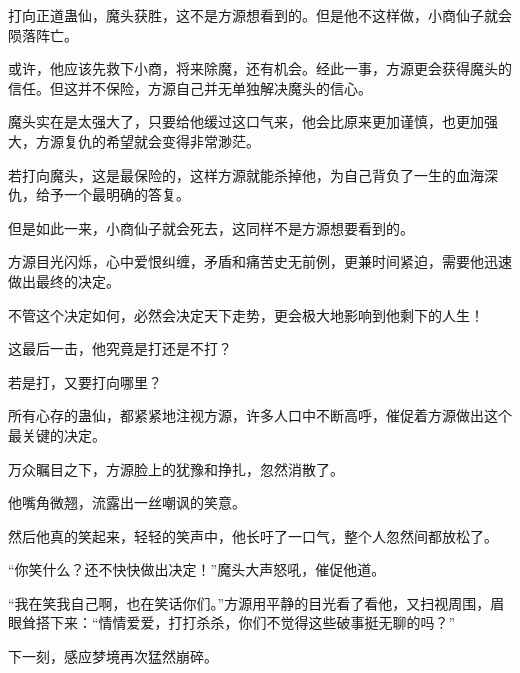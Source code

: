 \begin{this_body}
打向正道蛊仙，魔头获胜，这不是方源想看到的。但是他不这样做，小商仙子就会陨落阵亡。

或许，他应该先救下小商，将来除魔，还有机会。经此一事，方源更会获得魔头的信任。但这并不保险，方源自己并无单独解决魔头的信心。

魔头实在是太强大了，只要给他缓过这口气来，他会比原来更加谨慎，也更加强大，方源复仇的希望就会变得非常渺茫。

若打向魔头，这是最保险的，这样方源就能杀掉他，为自己背负了一生的血海深仇，给予一个最明确的答复。

但是如此一来，小商仙子就会死去，这同样不是方源想要看到的。

方源目光闪烁，心中爱恨纠缠，矛盾和痛苦史无前例，更兼时间紧迫，需要他迅速做出最终的决定。

不管这个决定如何，必然会决定天下走势，更会极大地影响到他剩下的人生！

这最后一击，他究竟是打还是不打？

若是打，又要打向哪里？

所有心存的蛊仙，都紧紧地注视方源，许多人口中不断高呼，催促着方源做出这个最关键的决定。

万众瞩目之下，方源脸上的犹豫和挣扎，忽然消散了。

他嘴角微翘，流露出一丝嘲讽的笑意。

然后他真的笑起来，轻轻的笑声中，他长吁了一口气，整个人忽然间都放松了。

“你笑什么？还不快快做出决定！”魔头大声怒吼，催促他道。

“我在笑我自己啊，也在笑话你们。”方源用平静的目光看了看他，又扫视周围，眉眼耸搭下来：“情情爱爱，打打杀杀，你们不觉得这些破事挺无聊的吗？”

下一刻，感应梦境再次猛然崩碎。

\end{this_body}

